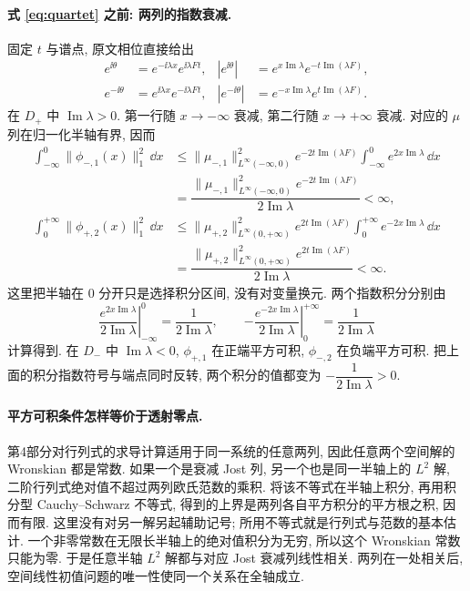 \paragraph{式 \eqref{eq:quartet} 之前: 两列的指数衰减.}
固定 $t$ 与谱点, 原文相位直接给出
\begin{align*}
e^{\ii\theta}&=e^{-\ii\lambda x}e^{\ii\lambda Ft},&
|e^{\ii\theta}|&=e^{x\operatorname{Im}\lambda}
 e^{-t\operatorname{Im}(\lambda F)},\\
e^{-\ii\theta}&=e^{\ii\lambda x}e^{-\ii\lambda Ft},&
|e^{-\ii\theta}|&=e^{-x\operatorname{Im}\lambda}
 e^{t\operatorname{Im}(\lambda F)}.
\end{align*}
在 $D_+$ 中 $\operatorname{Im}\lambda>0$.
第一行随 $x\to-\infty$ 衰减, 第二行随 $x\to+\infty$ 衰减.
对应的 $\mu$ 列在归一化半轴有界, 因而
\begin{align*}
\int_{-\infty}^0\|\phi_{-,1}(x)\|_1^2\,\dd x
&\le\|\mu_{-,1}\|_{L^\infty(-\infty,0)}^2
 e^{-2t\operatorname{Im}(\lambda F)}
 \int_{-\infty}^0 e^{2x\operatorname{Im}\lambda}\,\dd x\\
&=\dfrac{\|\mu_{-,1}\|_{L^\infty(-\infty,0)}^2
 e^{-2t\operatorname{Im}(\lambda F)}}{2\operatorname{Im}\lambda}<\infty,\\
\int_0^{+\infty}\|\phi_{+,2}(x)\|_1^2\,\dd x
&\le\|\mu_{+,2}\|_{L^\infty(0,+\infty)}^2
 e^{2t\operatorname{Im}(\lambda F)}
 \int_0^{+\infty} e^{-2x\operatorname{Im}\lambda}\,\dd x\\
&=\dfrac{\|\mu_{+,2}\|_{L^\infty(0,+\infty)}^2
 e^{2t\operatorname{Im}(\lambda F)}}{2\operatorname{Im}\lambda}<\infty.
\end{align*}
这里把半轴在 $0$ 分开只是选择积分区间, 没有对变量换元.
两个指数积分分别由
\[
\left.\dfrac{e^{2x\operatorname{Im}\lambda}}{2\operatorname{Im}\lambda}
\right|_{-\infty}^0
=\dfrac{1}{2\operatorname{Im}\lambda},
\qquad
\left.-\dfrac{e^{-2x\operatorname{Im}\lambda}}{2\operatorname{Im}\lambda}
\right|_0^{+\infty}
=\dfrac{1}{2\operatorname{Im}\lambda}
\]
计算得到.
在 $D_-$ 中 $\operatorname{Im}\lambda<0$,
$\phi_{+,1}$ 在正端平方可积, $\phi_{-,2}$ 在负端平方可积.
把上面的积分指数符号与端点同时反转,
两个积分的值都变为 $-\dfrac{1}{2\operatorname{Im}\lambda}>0$.

\paragraph{平方可积条件怎样等价于透射零点.}
第4部分对行列式的求导计算适用于同一系统的任意两列,
因此任意两个空间解的 Wronskian 都是常数.
如果一个是衰减 Jost 列, 另一个也是同一半轴上的 $L^2$ 解,
二阶行列式绝对值不超过两列欧氏范数的乘积.
将该不等式在半轴上积分, 再用积分型 Cauchy--Schwarz 不等式,
得到的上界是两列各自平方积分的平方根之积, 因而有限.
这里没有对另一解另起辅助记号; 所用不等式就是行列式与范数的基本估计.
一个非零常数在无限长半轴上的绝对值积分为无穷,
所以这个 Wronskian 常数只能为零.
于是任意半轴 $L^2$ 解都与对应 Jost 衰减列线性相关.
两列在一处相关后, 空间线性初值问题的唯一性使同一个关系在全轴成立.

